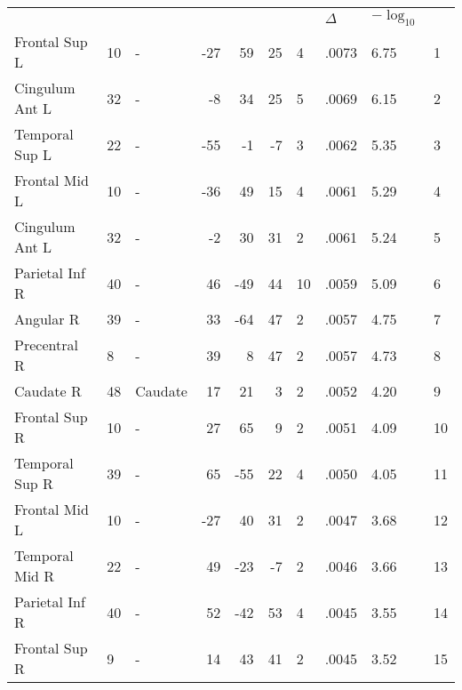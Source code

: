 \begin{table}
    \small
    \centering
    \begin{ThreePartTable}
    \begin{tabularx}{\textwidth}{l l p{1.4cm} *{3}{r} *{2}{P{.8cm}} P{1.3cm} P{.5cm}}
     \\
    \toprule
     &  &  &  &  &  &  & \(\Delta\)  & \(-\log_{10}\) &  \\
    \toprule

    Frontal Sup L  &  10  &  -  &  -27  &  59  &  25  &  4  &   .0073  &  6.75  &  1 \\
    Cingulum Ant L  &  32  &  -  &  -8  &  34  &  25  &  5  &   .0069  &  6.15  &  2 \\
    Temporal Sup L  &  22  &  -  &  -55  &  -1  &  -7  &  3  &   .0062  &  5.35  &  3 \\
    Frontal Mid L  &  10  &  -  &  -36  &  49  &  15  &  4  &   .0061  &  5.29  &  4 \\
    Cingulum Ant L  &  32  &  -  &  -2  &  30  &  31  &  2   &   .0061  &  5.24  &  5 \\
    Parietal Inf R  &  40  &  -  &  46  &  -49  &  44  &  10  &   .0059  &  5.09  &  6 \\
    Angular R  &  39  &  -  &  33  &  -64  &  47  &  2   &   .0057  &  4.75  &  7 \\
    Precentral R  &  8  &  -  &  39  &  8  &  47  &  2   &   .0057  &  4.73  &  8 \\
    Caudate R  &  48  &  Caudate  &  17  &  21  &  3  &  2   &   .0052  &  4.20  &  9 \\
    Frontal Sup R  &  10  &  -  &  27  &  65  &  9  &  2   &   .0051  &  4.09  &  10 \\
    Temporal Sup R  &  39  &  -  &  65  &  -55  &  22  &  4  &   .0050   &  4.05  &  11 \\
    Frontal Mid L  &  10  &  -  &  -27  &  40  &  31  &  2   &   .0047  &  3.68  &  12 \\
    Temporal Mid R  &  22  &  -  &  49  &  -23  &  -7  &  2   &   .0046   &  3.66  &  13 \\
    Parietal Inf R  &  40  &  -  &  52  &  -42  &  53  &  4  &   .0045   &  3.55  &  14 \\
    Frontal Sup R  &  9  &  -  &  14  &  43  &  41  &  2   &   .0045   &  3.52  &  15 \\

\end{tabularx}
\end{ThreePartTable}
\end{table}
